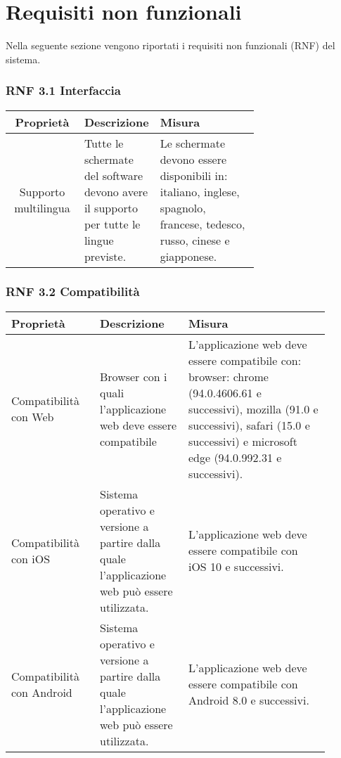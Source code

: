 \section{Requisiti non funzionali}
Nella seguente sezione vengono riportati i requisiti non funzionali (RNF) del sistema.

\subsubsection*{RNF 3.1 Interfaccia}
\begin{table}[ht]
    \centering
    \begin{tabular}{| c | m{0.3\linewidth} | m{0.4\linewidth} |}
        \hline
        \rowcolor{Gray}
        \textbf{Proprietà} & \textbf{Descrizione} & \textbf{Misura} \\
        \hline
        Supporto multilingua & Tutte le schermate del software devono avere il supporto per tutte le lingue previste.  & Le schermate devono essere disponibili in: italiano, inglese, spagnolo, francese, tedesco, russo, cinese e giapponese. \\
        \hline
    \end{tabular}
\end{table}

\subsubsection*{RNF 3.2 Compatibilità}
\begin{table}[ht]
    \centering
    \begin{tabular}{| m{0.25\linewidth} | m{0.25\linewidth} | m{0.4\linewidth} |}
        \hline
        \rowcolor{Gray}
        \textbf{Proprietà} & \textbf{Descrizione} & \textbf{Misura} \\
        \hline
        Compatibilità con Web & Browser con i quali l'applicazione web deve essere compatibile & L'applicazione web deve essere compatibile con: browser: chrome (94.0.4606.61 e successivi), mozilla (91.0 e successivi), safari (15.0 e successivi) e microsoft edge (94.0.992.31 e successivi).\\
        \hline
        Compatibilità con iOS & Sistema operativo e versione a partire dalla quale l'applicazione web può essere utilizzata. & L'applicazione web deve essere compatibile con iOS 10 e successivi. \\
        \hline
        Compatibilità con Android & Sistema operativo e versione a partire dalla quale l'applicazione web può essere utilizzata. & L'applicazione web deve essere compatibile con Android 8.0 e successivi.\\
        \hline
    \end{tabular}
\end{table}


